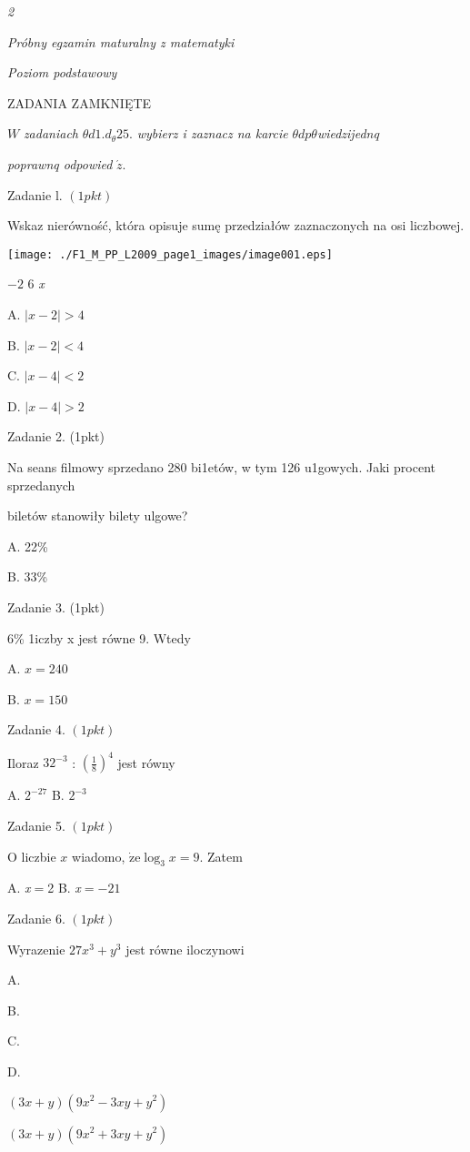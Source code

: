 \documentclass[a4paper,12pt]{article}
\begin{document}
{\it 2}

{\it Próbny egzamin maturalny z matematyki}

{\it Poziom podstawowy}

ZADANIA ZAMKNIĘTE

$W$ {\it zadaniach} $\theta d1. d_{\theta}25$. {\it wybierz i zaznacz na karcie} $\theta dp\theta${\it wiedzijednq}

{\it poprawnq odpowied} $\acute{z}.$

Zadanie l. $(1pkt)$

Wskaz nierówność, która opisuje sumę przedziałów zaznaczonych na osi liczbowej.
\begin{center}
\texttt{[image: ./F1\_M\_PP\_L2009\_page1\_images/image001.eps]}
\end{center}
$-2$  6  {\it x}

A. $|x-2|>4$

B. $|x-2|<4$

C. $|x-4|<2$

D. $|x-4|>2$

Zadanie 2. (1pkt)

Na seans filmowy sprzedano 280 bi1etów, w tym 126 u1gowych. Jaki procent sprzedanych

biletów stanowiły bilety ulgowe?

A. 22\%

B. 33\%

Zadanie 3. (1pkt)

6\% 1iczby x jest równe 9. Wtedy

A. $x=240$

B. $x=150$

Zadanie 4. $(1pkt)$

Iloraz $32^{-3}$ : $(\displaystyle \frac{1}{8})^{4}$ jest równy

A. $2^{-27}$ B. $2^{-3}$

Zadanie 5. $(1pkt)$

$\mathrm{O}$ liczbie $x$ wiadomo, $\dot{\mathrm{z}}\mathrm{e}\log_{3}x=9$. Zatem

A. {\it x}$=$2 B. {\it x}$=- 21$

Zadanie 6. $(1pkt)$

Wyrazenie $27x^{3}+y^{3}$ jest równe iloczynowi

A.

B.

C.

D.

$(3x+y)(9x^{2}-3xy+y^{2})$

$(3x+y)(9x^{2}+3xy+y^{2})$
\end{document}
